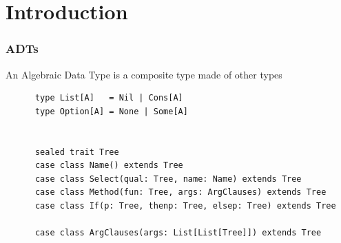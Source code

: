 \section{Introduction}
\begin{frame}[fragile]
  \frametitle{ADTs}

  An Algebraic Data Type is a composite type made of other types

  \begin{example}
    \begin{lstlisting}
      type List[A]   = Nil | Cons[A]
      type Option[A] = None | Some[A]


      sealed trait Tree
      case class Name() extends Tree
      case class Select(qual: Tree, name: Name) extends Tree
      case class Method(fun: Tree, args: ArgClauses) extends Tree
      case class If(p: Tree, thenp: Tree, elsep: Tree) extends Tree

      case class ArgClauses(args: List[List[Tree]]) extends Tree
    \end{lstlisting}
  \end{example}
\end{frame}


